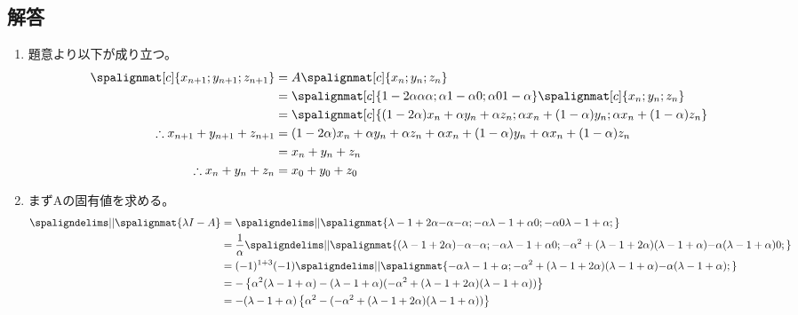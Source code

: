 \subsection{解答}
\begin{enumerate}[(1)]
	\item 題意より以下が成り立つ。
		\begin{align*}
			\spalignmat[c]{
				{x_{n + 1}};
				{y_{n + 1}};
				{z_{n + 1}}
			} 
			& = A
			\spalignmat[c]{
				{x_n};
				{y_n};
				{z_n}
			}\\
			& = \spalignmat[c]{
				{1 - 2\alpha} {\alpha} {\alpha};
				{\alpha} {1 - \alpha} {0};
				{\alpha} {0} {1 - \alpha}
			}
			\spalignmat[c]{
				{x_n};
				{y_n};
				{z_n}
			}\\
			& = \spalignmat[c]{
				{(1 - 2\alpha)x_n + \alpha y_n + \alpha z_n};
				{\alpha x_n + (1 - \alpha)y_n};
				{\alpha x_n + (1 - \alpha)z_n}
			}\\
			\therefore
			x_{n + 1} + y_{n + 1} + z_{n + 1} 
			&=  (1 - 2\alpha)x_n + \alpha y_n + \alpha z_n + \alpha x_n + (1 - \alpha)y_n + \alpha x_n + (1 - \alpha)z_n\\
			&=  x_n + y_n + z_n\\
			\therefore
			x_n + y_n + z_n &= x_0 + y_0 + z_0
		\end{align*}
	\item まずAの固有値を求める。
		\begin{align*}
			\spaligndelims\vert\vert \spalignmat{{\lambda I - A}}
			& = \spaligndelims\vert\vert \spalignmat{
			{\lambda - 1 + 2\alpha} {-\alpha} {-\alpha};
			{-\alpha} {\lambda - 1 + \alpha} {0};
			{-\alpha} {0} {\lambda - 1 + \alpha};
			}\\
			& = \frac{1}{\alpha}\spaligndelims\vert\vert \spalignmat{
			{(\lambda - 1 + 2\alpha)} {-\alpha} {-\alpha};
			{-\alpha} {\lambda - 1 + \alpha} {0};
			{-\alpha^{2} + (\lambda - 1 + 2\alpha)(\lambda - 1 + \alpha)} {-\alpha(\lambda - 1 + \alpha)} {0};
			}\\
			& = (-1)^{1 + 3}(-1)\spaligndelims\vert\vert \spalignmat{
			{-\alpha} {\lambda - 1 + \alpha};
			{-\alpha^{2} + (\lambda - 1 + 2\alpha)(\lambda - 1 + \alpha)} {-\alpha(\lambda - 1 + \alpha)};
			}\\
			& = -\left\{\alpha^{2}(\lambda - 1 + \alpha) - (\lambda - 1 + \alpha)(-\alpha^{2} + (\lambda - 1 + 2\alpha)(\lambda - 1 + \alpha))\right\} \\
			& = -(\lambda - 1 + \alpha)\left\{\alpha^{2} - (-\alpha^{2} + (\lambda - 1 + 2\alpha)(\lambda - 1 + \alpha))\right\}                       \\

\end{align*}
\end{enumerate}
